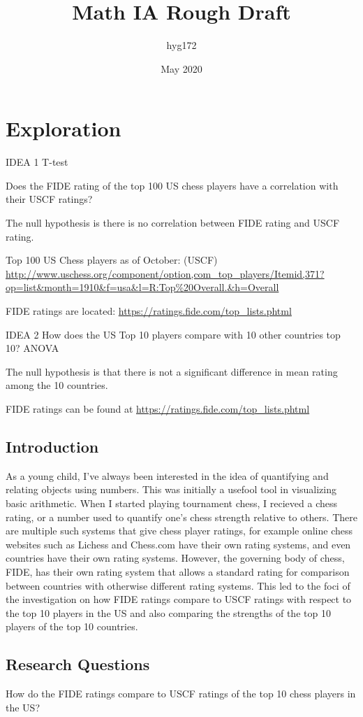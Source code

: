 \documentclass[12pt]{article}
\title{Math IA Rough Draft}
\author{hyg172}
\date{May 2020}
\begin{document}
\maketitle

\tableofcontents
\newpage

\section{Exploration}
IDEA 1
T-test

Does the FIDE rating of the top 100 US chess players have a correlation with their USCF ratings?

The null hypothesis is there is no correlation between FIDE rating and USCF rating.

Top 100 US Chess players as of October: (USCF)
\url{http://www.uschess.org/component/option,com_top_players/Itemid,371?op=list&month=1910&f=usa&l=R:Top%20Overall.&h=Overall}

FIDE ratings are located:
\url{https://ratings.fide.com/top_lists.phtml}

IDEA 2
How does the US Top 10 players compare with 10 other countries top 10?
ANOVA

The null hypothesis is that there is not a significant difference in mean rating among the 10 countries.

FIDE ratings can be found at 
\url{https://ratings.fide.com/top_lists.phtml}

\subsection{Introduction}
As a young child, I've always been interested in the idea of quantifying and relating objects using numbers. This was initially a usefool tool in visualizing basic arithmetic. When I started playing tournament chess, I recieved a chess rating, or a number used to quantify one's chess strength relative to others. There are multiple such systems that give chess player ratings, for example online chess websites such as Lichess and Chess.com have their own rating systems, and even countries have their own rating systems. However, the governing body of chess, FIDE, has their own rating system that allows a standard rating for comparison between countries with otherwise different rating systems. This led to the foci of the investigation on how FIDE ratings compare to USCF ratings with respect to the top 10 players in the US and also comparing the strengths of the top 10 players of the top 10 countries.
\subsection{Research Questions}
How do the FIDE ratings compare to USCF ratings of the top 10 chess players in the US?
\end{document}
